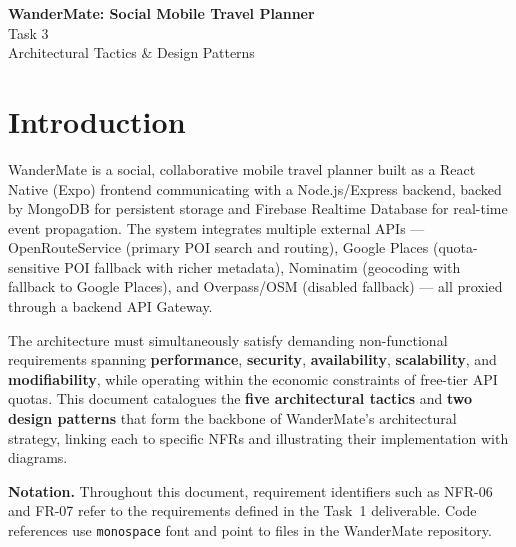 \documentclass[12pt, a4paper]{article}
\newcommand{\code}[1]{\texttt{\small #1}}
\begin{document}
\thispagestyle{empty}

\begin{center}
  {\LARGE\bfseries WanderMate: Social Mobile Travel Planner}\\[0.8em]
  {\large Task 3}\\[0.4em]
  {\large Architectural Tactics \& Design Patterns}
\end{center}

\tableofcontents
\newpage

\section{Introduction}

WanderMate is a social, collaborative mobile travel planner built as a React Native (Expo) frontend communicating with a Node.js/Express backend, backed by MongoDB for persistent storage and Firebase Realtime Database for real-time event propagation. The system integrates multiple external APIs --- OpenRouteService (primary POI search and routing), Google Places (quota-sensitive POI fallback with richer metadata), Nominatim (geocoding with fallback to Google Places), and Overpass/OSM (disabled fallback) --- all proxied through a backend API Gateway.

The architecture must simultaneously satisfy demanding non-functional requirements spanning \textbf{performance}, \textbf{security}, \textbf{availability}, \textbf{scalability}, and \textbf{modifiability}, while operating within the economic constraints of free-tier API quotas. This document catalogues the \textbf{five architectural tactics} and \textbf{two design patterns} that form the backbone of WanderMate's architectural strategy, linking each to specific NFRs and illustrating their implementation with diagrams.

\begin{tcolorbox}[notebox]
  \textbf{Notation.} Throughout this document, requirement identifiers such as \textsc{NFR-06} and \textsc{FR-07} refer to the requirements defined in the Task~1 deliverable. Code references use \code{monospace} font and point to files in the WanderMate repository.
\end{tcolorbox}

\end{document}
